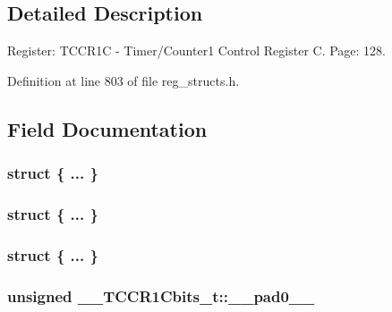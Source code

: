 \subsection{Detailed Description}
Register\+: T\+C\+C\+R1\+C -\/ Timer/\+Counter1 Control Register C. Page\+: 128. 

Definition at line 803 of file reg\+\_\+structs.\+h.



\subsection{Field Documentation}
\hypertarget{union_____t_c_c_r1_cbits__t_a08fcb31f71956de6c29a27fc60fe8992}{\subsubsection[{"@195}]{\setlength{\rightskip}{0pt plus 5cm}struct \{ ... \} }}\label{union_____t_c_c_r1_cbits__t_a08fcb31f71956de6c29a27fc60fe8992}
\hypertarget{union_____t_c_c_r1_cbits__t_a5d5b56e345cba477ade816e0c8e22536}{\subsubsection[{"@197}]{\setlength{\rightskip}{0pt plus 5cm}struct \{ ... \} }}\label{union_____t_c_c_r1_cbits__t_a5d5b56e345cba477ade816e0c8e22536}
\hypertarget{union_____t_c_c_r1_cbits__t_a1ff3911e9c5d7d53acb140093b5491f6}{\subsubsection[{"@199}]{\setlength{\rightskip}{0pt plus 5cm}struct \{ ... \} }}\label{union_____t_c_c_r1_cbits__t_a1ff3911e9c5d7d53acb140093b5491f6}
\hypertarget{union_____t_c_c_r1_cbits__t_a3e462c51b759f394e47a431883de7d9d}{
\subsubsection[{\+\_\+\+\_\+pad0\+\_\+\+\_\+}]{\setlength{\rightskip}{0pt plus 5cm}unsigned \+\_\+\+\_\+\+T\+C\+C\+R1\+Cbits\+\_\+t\+::\+\_\+\+\_\+pad0\+\_\+\+\_\+}}\label{union_____t_c_c_r1_cbits__t_a3e462c51b759f394e47a431883de7d9d}



